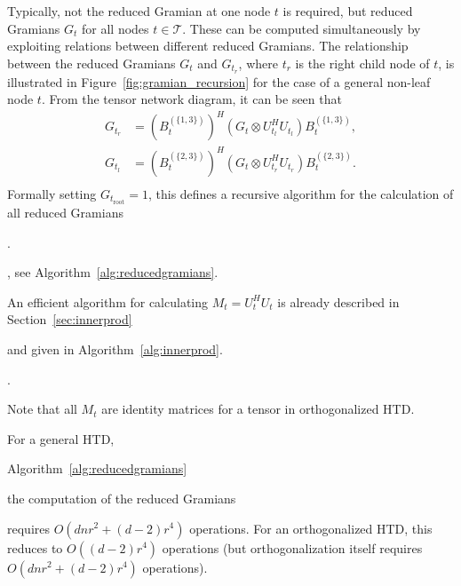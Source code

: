 \documentclass[11pt, a4paper]{article}
\newcommand{\calB}{\mathcal{B}}
\newcommand{\calT}{\mathcal{T}}
\newcommand{\innerprod}[2]{{\left\langle#1,#2\right\rangle}}
\begin{document}
Typically, not the reduced Gramian at one node $t$ is required, but
reduced Gramians $G_t$ for all nodes $t \in \calT$. These can be computed
simultaneously by exploiting
relations between different reduced Gramians.
The relationship between the reduced Gramians $G_t$
and $G_{t_r}$, where $t_r$ is the right child node of $t$, is
illustrated in Figure~\ref{fig:gramian_recursion} for the case of a
general non-leaf node $t$. From the tensor network diagram, it can be seen that
\begin{equation} \label{eq:gramian_recursion}
  \begin{aligned}
    G_{t_r} &= (B_t^{(\{1, 3\})})^H (G_t \otimes U_{t_l}^H U_{t_l} ) B_t^{(\{1,3\})}, \\
    G_{t_l} &= (B_t^{(\{2,3\})})^H (G_t \otimes U_{t_r}^H U_{t_r}) B_t^{(\{2,3\})}. \\
  \end{aligned}
\end{equation}
Formally setting $G_{t_\text{root}} = 1$, this defines a recursive
algorithm for the calculation of all reduced Gramians%
\begin{submitted}
.
\end{submitted}
\begin{preprint}
, see
Algorithm~\ref{alg:reducedgramians}.
\end{preprint}
An efficient algorithm
for calculating $M_t = U_t^H U_t$ is already described in Section~\ref{sec:innerprod}%
\begin{preprint}
and given in
Algorithm~\ref{alg:innerprod}. 
\end{preprint}
\begin{submitted}
.
\end{submitted}
Note that all $M_t$
are identity matrices for a tensor in orthogonalized HTD.

For a general HTD,
\begin{preprint}
Algorithm~\ref{alg:reducedgramians}
\end{preprint}
\begin{submitted}
the computation of the reduced Gramians
\end{submitted}
requires $O(dnr^2 + (d-2)r^4)$ operations. For an orthogonalized HTD,
this reduces to $O((d-2)r^4)$ operations (but orthogonalization itself requires $O(dnr^2 + (d-2)r^4)$ operations).
\end{document}
